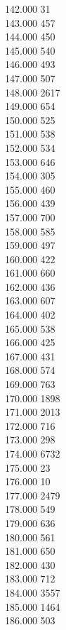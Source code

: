 { 142.000	31 \\
 143.000	457 \\
 144.000	450 \\
 145.000	540 \\
 146.000	493 \\
 147.000	507 \\
 148.000	2617 \\
 149.000	654 \\
 150.000	525 \\
 151.000	538 \\
 152.000	534 \\
 153.000	646 \\
 154.000	305 \\
 155.000	460 \\
 156.000	439 \\
 157.000	700 \\
 158.000	585 \\
 159.000	497 \\
 160.000	422 \\
 161.000	660 \\
 162.000	436 \\
 163.000	607 \\
 164.000	402 \\
 165.000	538 \\
 166.000	425 \\
 167.000	431 \\
 168.000	574 \\
 169.000	763 \\
 170.000	1898 \\
 171.000	2013 \\
 172.000	716 \\
 173.000	298 \\
 174.000	6732 \\
 175.000	23 \\
 176.000	10 \\
 177.000	2479 \\
 178.000	549 \\
 179.000	636 \\
 180.000	561 \\
 181.000	650 \\
 182.000	430 \\
 183.000	712 \\
 184.000	3557 \\
 185.000	1464 \\
 186.000	503 \\
}
